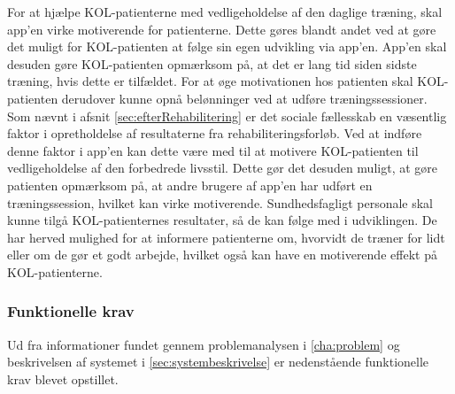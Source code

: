 For at hjælpe KOL-patienterne med vedligeholdelse af den daglige træning, skal app’en virke motiverende for patienterne. Dette gøres blandt andet ved at gøre det muligt for KOL-patienten at følge sin egen udvikling via app’en. App’en skal desuden gøre KOL-patienten opmærksom på, at det er lang tid siden sidste træning, hvis dette er tilfældet. For at øge motivationen hos patienten skal KOL-patienten derudover kunne opnå belønninger ved at udføre træningssessioner.
Som nævnt i afsnit \ref{sec:efterRehabilitering} er det sociale fællesskab en væsentlig faktor i opretholdelse af resultaterne fra rehabiliteringsforløb. Ved at indføre denne faktor i app’en kan dette være med til at motivere KOL-patienten til vedligeholdelse af den forbedrede livsstil. Dette gør det desuden muligt, at gøre patienten opmærksom på, at andre brugere af app’en har udført en træningssession, hvilket kan virke motiverende.
Sundhedsfagligt personale skal kunne tilgå KOL-patienternes resultater, så de kan følge med i udviklingen. De har herved mulighed for at informere patienterne om, hvorvidt de træner for lidt eller om de gør et godt arbejde, hvilket også kan have en motiverende effekt på KOL-patienterne.

\subsubsection{Funktionelle krav}
Ud fra informationer fundet gennem problemanalysen i \autoref{cha:problem} og beskrivelsen af systemet i \autoref{sec:systembeskrivelse} er nedenstående funktionelle krav blevet opstillet. 
  
